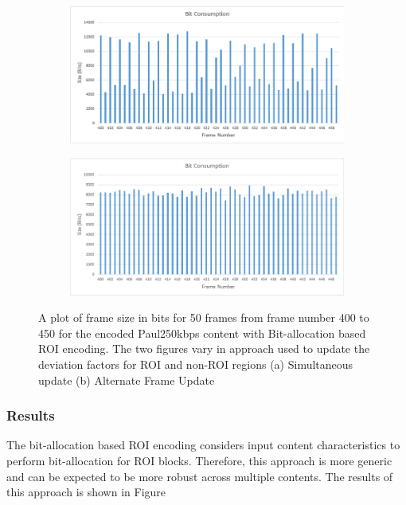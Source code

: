 \documentclass[11pt]{article} %
\begin{document}
\begin{figure}
	\centering
	\begin{subfigure}[t]{\textwidth}
		\centering
		\includegraphics[width=\textwidth]{RC_bit_allocation/Oscillation/Paul250kbps_RC_bit_alloc_osc.png}
		\caption{}
		\label{fig: ROI bit-alloc oscc}
	\end{subfigure}
	\begin{subfigure}[t]{\textwidth}
		\centering
		\includegraphics[width=\textwidth]{RC_bit_allocation/Oscillation/Paul250kbps_RC_bit_alloc_corrected_osc.png}
		\caption{}
		\label{fig: ROI bit-alloc oscc corrected}
	\end{subfigure}
	\caption{A plot of frame size in bits for 50 frames from frame number 400 to 450 for the encoded Paul250kbps content with Bit-allocation based ROI encoding. The two figures vary in approach used to update the deviation factors for ROI and non-ROI regions (a) Simultaneous update (b) Alternate Frame Update}
	\label{fig: ROI bit-alloc oscc example}
\end{figure}

\subsubsection{Results}
The bit-allocation based ROI encoding considers input content characteristics to perform bit-allocation for ROI blocks. Therefore, this approach is more generic and can be expected to be more robust across multiple contents. The results of this approach is shown in Figure 
\end{document}
